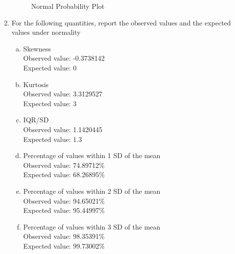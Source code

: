 \documentclass[12pt,letterpaper]{article}
\begin{document}
\begin{enumerate}
\begin{figure}[h]
    \caption{Normal Probability Plot}
  \end{figure}
  \item For the following quantities, report the observed values and the expected values under normality
  \begin{enumerate}[a.]
    \item Skewness\\
    Observed value: -0.3738142\\
    Expected value: 0
    \item Kurtosis\\
    Observed value: 3.3129527\\
    Expected value: 3
    \item IQR/SD\\
    Observed value: 1.1420445\\
    Expected value: 1.3
    \newpage
    \item Percentage of values within 1 SD of the mean\\
    Observed value: 74.89712\%\\
    Expected value: 68.26895\%
    \item Percentage of values within 2 SD of the mean\\
    Observed value: 94.65021\%\\
    Expected value: 95.44997\%
    \item Percentage of values within 3 SD of the mean\\
    Observed value: 98.35391\%\\
    Expected value: 99.73002\%
  \end{enumerate}
\end{enumerate}
\vspace{0.5em}

\end{document}
